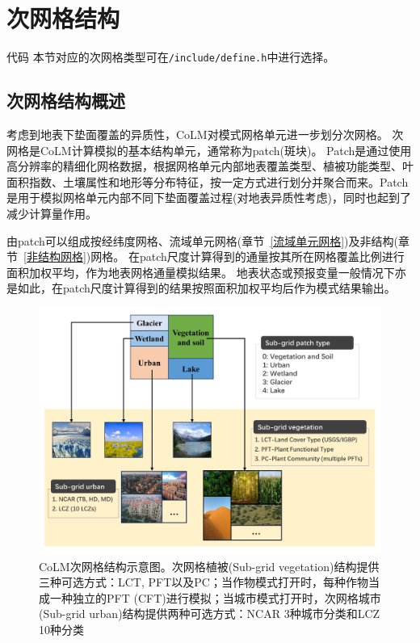 \section{次网格结构}\label{次网格}
\begin{mymdframed}{代码}
本节对应的次网格类型可在\texttt{/include/define.h}中进行选择。
\end{mymdframed}
\subsection{次网格结构概述}
考虑到地表下垫面覆盖的异质性，CoLM对模式网格单元进一步划分次网格。
次网格是CoLM计算模拟的基本结构单元，通常称为patch(斑块)。
Patch是通过使用高分辨率的精细化网格数据，根据网格单元内部地表覆盖类型、植被功能类型、叶面积指数、土壤属性和地形等分布特征，按一定方式进行划分并聚合而来。Patch是用于模拟网格单元内部不同下垫面覆盖过程(对地表异质性考虑)，同时也起到了减少计算量作用。


由patch可以组成按经纬度网格、流域单元网格(章节~\ref{流域单元网格})及非结构(章节~\ref{非结构网格})网格。
在patch尺度计算得到的通量按其所在网格覆盖比例进行面积加权平均，作为地表网格通量模拟结果。
地表状态或预报变量一般情况下亦是如此，在patch尺度计算得到的结果按照面积加权平均后作为模式结果输出。

{
\begin{figure}[htbp]
\centering
\includegraphics[width=\textwidth]{Figures/模式构架/CoLM次网格结构示意图-v2.jpg}
\caption[CoLM次网格结构示意图]{CoLM次网格结构示意图。次网格植被(Sub-grid vegetation)结构提供三种可选方式：LCT, PFT以及PC；当作物模式打开时，每种作物当成一种独立的PFT (CFT)进行模拟；当城市模式打开时，次网格城市(Sub-grid urban)结构提供两种可选方式：NCAR 3种城市分类和LCZ 10种分类}
\label{fig:次网格结构示意图}
\end{figure}
}



